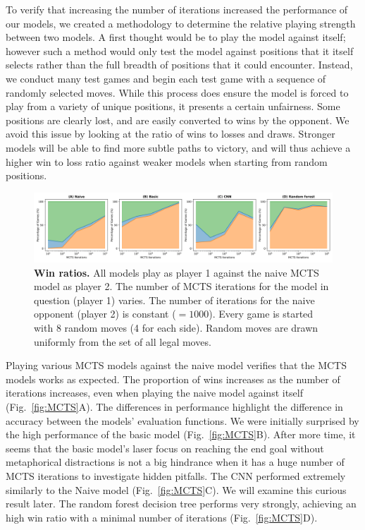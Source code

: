 \documentclass[10pt]{article}
\begin{document}
To verify that increasing the number of iterations increased the performance of our models, we created a methodology to determine the relative playing strength between two models. A first thought would be to play the model against itself; however such a method would only test the model against positions that it itself selects rather than the full breadth of positions that it could encounter. Instead, we conduct many test games and begin each test game with a sequence of randomly selected moves. While this process does ensure the model is forced to play from a variety of unique positions, it presents a certain unfairness. Some positions are clearly lost, and are easily converted to wins by the opponent. We avoid this issue by looking at the ratio of wins to losses and draws. Stronger models will be able to find more subtle paths to victory, and will thus achieve a higher win to loss ratio against weaker models when starting from random positions.

\begin{figure}[H]
    \centering
    \includegraphics[width=\linewidth]{win_rates.png}
    \caption{\textbf{Win ratios.} All models play as player 1 against the naive MCTS model as player 2. The number of MCTS iterations for the model in question (player 1) varies. The number of iterations for the naive opponent (player 2) is constant ($= 1000$). Every game is started with 8 random moves (4 for each side). Random moves are drawn uniformly from the set of all legal moves.}
    \label{fig:selfplay}
\end{figure}

Playing various MCTS models against the naive model verifies that the MCTS models works as expected. The proportion of wins increases as the number of iterations increases, even when playing the naive model against itself (Fig.~\ref{fig:MCTS}A). The differences in performance highlight the difference in accuracy between the models' evaluation functions. We were initially surprised by the high performance of the basic model (Fig.~\ref{fig:MCTS}B). After more time, it seems that the basic model's laser focus on reaching the end goal without metaphorical distractions is not a big hindrance when it has a huge number of MCTS iterations to investigate hidden pitfalls. The CNN performed extremely similarly to the Naive model (Fig.~\ref{fig:MCTS}C). We will examine this curious result later. The random forest decision tree performs very strongly, achieving an high win ratio with a minimal number of iterations (Fig.~\ref{fig:MCTS}D). 
\end{document}
